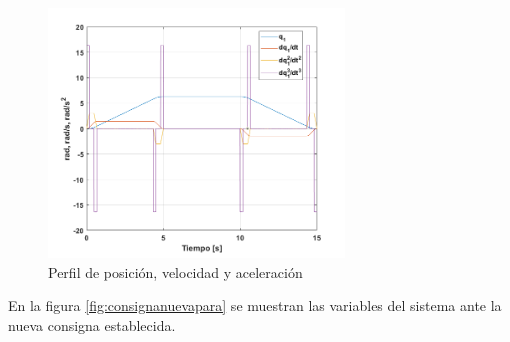 \documentclass[10pt]{article}
\begin{document}
\begin{itemize}
 \begin{figure}[h!]
	\centering
	\includegraphics[width=0.7\textwidth]{consignasnuevas.png}
	\caption{\label{fig:consignasnuevas}Perfil de posición, velocidad y aceleración}
	\end{figure}

	En la figura \ref{fig:consignanuevapara} se muestran las variables del sistema ante la nueva consigna establecida.


\end{itemize}
\end{document}
